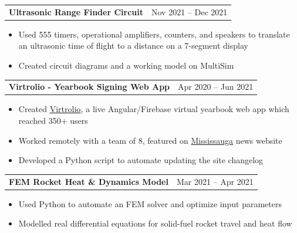 \documentclass[a4paper,10pt]{article}
\begin{document}
\begin{tabularx}{\linewidth}{@{}X r@{}}
\begin{minipage}[t]{\linewidth}
  \textbf{Ultrasonic Range Finder Circuit}
\end{minipage}
&     Nov 2021 -- Dec 2021
\end{tabularx}


\begin{itemize}[nosep,after=\strut, leftmargin=1em, itemsep=3pt,label=--]
  \item Used 555 timers, operational amplifiers, counters, and speakers to translate an ultrasonic time of flight to a distance on a 7-segment display
\item Created circuit diagrams and a working model on MultiSim
\end{itemize}


\begin{tabularx}{\linewidth}{@{}X r@{}}
\begin{minipage}[t]{\linewidth}
  \textbf{Virtrolio - Yearbook Signing Web App}
\end{minipage}
&     Apr 2020 -- Jun 2021
\end{tabularx}


\begin{itemize}[nosep,after=\strut, leftmargin=1em, itemsep=3pt,label=--]
  \item Created \href{https://virtrolio.web.app/}{Virtrolio}\textit{, }a live Angular/Firebase virtual yearbook web app which reached 350+ users
\item Worked remotely with a team of 8, featured on \href{https://www.mississauga.com/community-story/10071561--something-to-cherish-former-mississauga-students-launch-online-yearbook/}{Mississauga} news website
\item Developed a Python script to automate updating the site changelog
\end{itemize}


\begin{tabularx}{\linewidth}{@{}X r@{}}
\begin{minipage}[t]{\linewidth}
  \textbf{FEM Rocket Heat \& Dynamics Model}
\end{minipage}
&     Mar 2021 -- Apr 2021
\end{tabularx}


\begin{itemize}[nosep,after=\strut, leftmargin=1em, itemsep=3pt,label=--]
  \item Used Python to automate an FEM solver and optimize input parameters
\item Modelled real differential equations for solid-fuel rocket travel and heat flow
\end{itemize}
\end{document}
